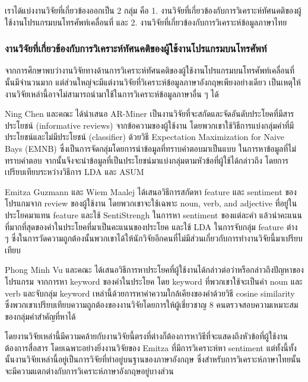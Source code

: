 
เราได้แบ่งงานวิจัยที่เกี่ยวข้องออกเป็น 2 กลุ่ม คือ 1. งานวิจัยที่เกี่ยวข้องกับการวิเคราะห์ทัศนคติของผู้ใช้งานโปรแกรมบนโทรศัพท์เคลื่อนที่ และ 2. งานวิจัยที่เกี่ยวข้องกับการวิเคราะห์ข้อมูลภาษาไทย

\subsubsection{งานวิจัยที่เกี่ยวข้องกับการวิเคราะห์ทัศนคติของผู้ใช้งานโปรแกรมบนโทรศัพท์}
จากการศึกษาพบว่างานวิจัยทางด้านการวิเคราะห์ทัศนคติของผู้ใช้งานโปรแกรมบนโทรศัพท์เคลื่อนที่นั้นมีจำนวนมาก แต่ส่วนใหญ่จะมีแต่งานวิจัยที่วิเคราะห์ข้อมูลภาษาอังกฤษเพียงอย่างเดียว \cite{ar-miner,keywordmining,userslikefeature} เป็นเหตุให้งานวิจัยเหล่านี้อาจไม่สามารถนำมาใช้ในการวิเคราะห์ข้อมูลภาษาอื่น ๆ ได้

Ning Chen และคณะ\cite{ar-miner} ได้นำเสนอ AR-Miner เป็นงานวิจัยที่จะสกัดและจัดอันดับประโยคที่มีสารประโยชน์ (informative reviews) จากข้อความของผู้ใช้งาน โดยพวกเขาใช้วิธีการแบ่งกลุ่มคำที่มีประโยชน์และไม่มีประโยชน์ (classifier) ด้วยวิธี Expectation Maximization for Naive Bays (EMNB) \cite{EMNB} ซึ่งเป็นการจัดกลุ่มโดยการนำข้อมูลที่ทราบคำตอบมาเป็นแบบ ในการหาข้อมูลที่ไม่ทราบคำตอบ จากนั้นจึงจะนำข้อมูลที่เป็นประโยชน์มาแบ่งกลุ่มตามหัวข้อที่ผู้ใช้ได้กล่าวถึง โดยการเปรียบเทียบระหว่างวิธีการ LDA และ ASUM

Emitza Guzmann และ Wiem Maalej \cite{userslikefeature} ได้เสนอวิธีการสกัดหา feature และ sentiment ของโปรแกมจาก review ของผู้ใช้งาน โดยพวกเขาจะใช้เฉพาะ noun, verb, and adjective ที่อยู่ในประโยคมาแทน feature และใช้ SentiStrengh \cite{SentiStrength} ในการหา sentiment ของแต่ละคำ แล้วนำคะแนนที่มากที่สุดของคำในประโยคที่มาเป็นคะแนนของประโยค และใช้ LDA ในการจับกลุ่ม feature ต่าง ๆ ซึ่งในการวัดความถูกต้องนั้นพวกเขาได้ให้นักวิจัยอีกคนที่ไม่มีส่วนเกี่ยวกับการทำงานวิจัยนี้มาเปรียบเทียบ

Phong Minh Vu และคณะ \cite{keywordmining} ได้เสนอวิธีการหาประโยคที่ผู้ใช้งานได้กล่าวต่อว่าหรือกล่าวถึงปัญหาของโปรแกรม จากการหา keyword ของคำในประโยค โดย keyword ที่พวกเขาใช้จะเป็นคำ noun และ verb และจับกลุ่ม keyword เหล่านี้ด้วยการหาค่าความใกล้เคียงของคำด้วยวิธี cosine similarity \cite{cosinesimilarity} ซึ่งพวกเขาเปรียบเทียบความถูกต้องของงานวิจัยโดยการให้ผู้เชี่ยวชาญ 8 คนตรวจสอบความเหมาะสมของกลุ่มคำสำคัญที่หาได้

โดยงานวิจัยเหล่านี้มีความคล้ายกับงานวิจัยนี้ตรงที่ต่างก็ต้องการหาวิธีที่จะแสดงถึงหัวข้อที่ผู้ใช้งานต้องการสื่อสาร โดยเฉพาะอย่างยิ่งงานวิจัยของ Emitza ที่มีการวิเคราะห์หา sentiment แต่ทั้งนี้ทั้งนั้นงานวิจัยเหล่านี้อยู่เป็นการวิจัยที่ทำอยู่บนฐานของภาษาอังกฤษ ซึ่งสำหรับการวิเคราะห์ภาษาไทยนั้นจะมีความแตกต่างกับการวิเคราะห์ภาษาอังกฤษอยู่บางส่วน


